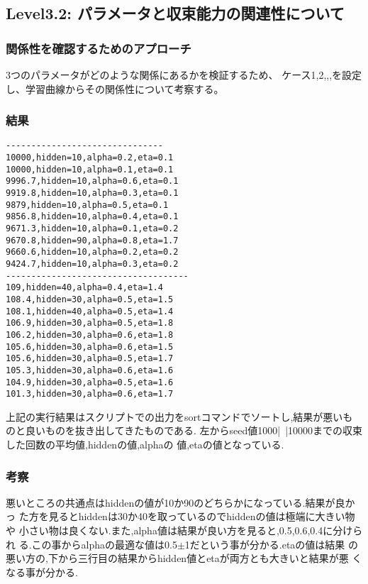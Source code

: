 \subsection{Level3.2: パラメータと収束能力の関連性について}
\subsubsection{関係性を確認するためのアプローチ}
3つのパラメータがどのような関係にあるかを検証するため、
ケース1,2,,,を設定し、学習曲線からその関係性について考察する。

\subsubsection{結果}
\begin{verbatim}
-------------------------------
10000,hidden=10,alpha=0.2,eta=0.1
10000,hidden=10,alpha=0.1,eta=0.1
9996.7,hidden=10,alpha=0.6,eta=0.1
9919.8,hidden=10,alpha=0.3,eta=0.1
9879,hidden=10,alpha=0.5,eta=0.1
9856.8,hidden=10,alpha=0.4,eta=0.1
9671.3,hidden=10,alpha=0.1,eta=0.2
9670.8,hidden=90,alpha=0.8,eta=1.7
9660.6,hidden=10,alpha=0.2,eta=0.2
9424.7,hidden=10,alpha=0.3,eta=0.2
------------------------------------
109,hidden=40,alpha=0.4,eta=1.4
108.4,hidden=30,alpha=0.5,eta=1.5
108.1,hidden=40,alpha=0.5,eta=1.4
106.9,hidden=30,alpha=0.5,eta=1.8
106.2,hidden=30,alpha=0.6,eta=1.8
105.6,hidden=30,alpha=0.6,eta=1.5
105.6,hidden=30,alpha=0.5,eta=1.7
105.3,hidden=30,alpha=0.6,eta=1.6
104.9,hidden=30,alpha=0.5,eta=1.6
101.3,hidden=30,alpha=0.6,eta=1.7
\end{verbatim}
上記の実行結果はスクリプトでの出力をsortコマンドでソートし,結果が悪いも
のと良いものを抜き出してきたものである.
左からseed値1000|~|10000までの収束した回数の平均値,hiddenの値,alphaの
値,etaの値となっている.
\subsubsection{考察}
悪いところの共通点はhiddenの値が10か90のどちらかになっている.結果が良かっ
た方を見るとhiddenは30か40を取っているのでhiddenの値は極端に大きい物や
小さい物は良くない.また,alpha値は結果が良い方を見ると,0.5,0.6,0.4に分けられ
る.この事からalphaの最適な値は0.5$\pm$1だという事が分かる.etaの値は結果
の悪い方の,下から三行目の結果からhidden値とetaが両方とも大きいと結果が悪
くなる事が分かる.
